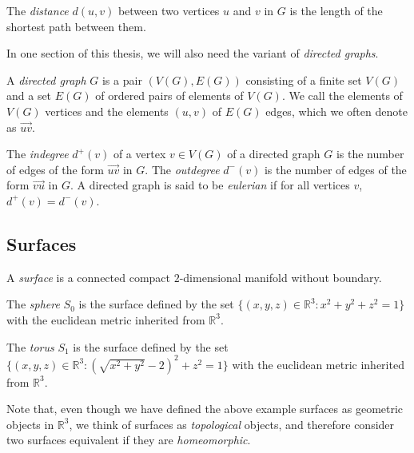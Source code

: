 \begin{definition}
	The \emph{distance} $d(u, v)$ between two vertices $u$ and $v$ in $G$ is the length of the
	shortest path between them.
\end{definition}

In one section of this thesis, we will also need the variant of \emph{directed graphs}.


\begin{definition}
A \emph{directed graph} $G$ is a pair $(V(G), E(G))$ consisting of a finite set $V(G)$ and a set 
$E(G)$ of ordered pairs of elements
 of $V(G)$. We call the elements of $V(G)$ vertices and
the elements $(u, v)$ of $E(G)$ edges, which we often denote as $\overrightarrow{uv}$.
\end{definition}

\begin{definition}
	The \emph{indegree} $d^+(v)$ of a vertex $v \in V(G)$ of a directed graph $G$ is the number
	of edges of the form $\overrightarrow{uv}$ in $G$. The \emph{outdegree} $d^-(v)$ is the number
	of edges of the form $\overrightarrow{vu}$ in $G$. A directed graph is said to be 
	\emph{eulerian} if for all vertices $v$, $d^+(v) = d^-(v)$. 
\end{definition}



\subsection{Surfaces}

\begin{definition}
A \emph{surface} is a connected compact $2$-dimensional manifold without boundary. 
\end{definition}

\begin{example}
The \emph{sphere} $S_0$ is the surface defined by the set $\{(x, y, z) \in \mathbb{R}^3 : x^2+y^2
+z^2 = 1\}$ with the euclidean metric inherited from $\mathbb{R}^3$. 

The \emph{torus} $S_1$ is the surface defined by the set $\{(x, y, z) \in \mathbb{R}^3 :  (\sqrt{x^2 + y^2} - 2)^2 + z^2 = 1\}$ with the euclidean metric inherited from $\mathbb{R}^3$.
\end{example}

Note that, even though we have defined the above example surfaces as geometric objects in
$\mathbb{R}^3$, we think of surfaces as \emph{topological} objects, and therefore consider two
surfaces equivalent if they are \emph{homeomorphic}. 

